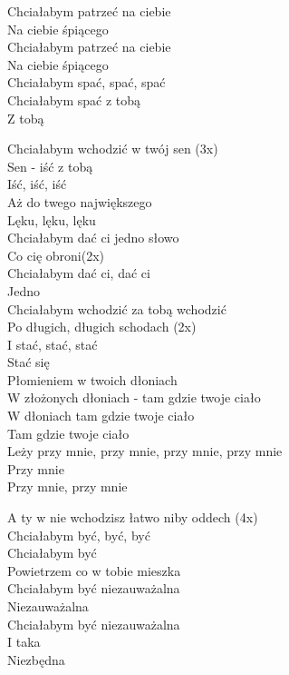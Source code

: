 \begin{text}
    Chciałabym patrzeć na ciebie\\
    Na ciebie śpiącego\\
    Chciałabym patrzeć na ciebie\\
    Na ciebie śpiącego\\
    Chciałabym spać, spać, spać\\
    Chciałabym spać z tobą\\
    Z tobą

    Chciałabym wchodzić w twój sen (3x)\\
    Sen - iść z tobą\\
    Iść, iść, iść\\
    Aż do twego największego\\
    Lęku, lęku, lęku\\
    Chciałabym dać ci jedno słowo\\
    Co cię obroni(2x)\\
    Chciałabym dać ci, dać ci\\
    Jedno\\
    Chciałabym wchodzić za tobą wchodzić\\
    Po długich, długich schodach (2x)\\
    I stać, stać, stać\\
    Stać się\\
    Płomieniem w twoich dłoniach\\
    W złożonych dłoniach - tam gdzie twoje ciało\\
    W dłoniach tam gdzie twoje ciało\\
    Tam gdzie twoje ciało\\
    Leży przy mnie, przy mnie, przy mnie, przy mnie\\
    Przy mnie\\
    Przy mnie, przy mnie

    A ty w nie wchodzisz łatwo niby oddech (4x)\\
    Chciałabym być, być, być\\
    Chciałabym być\\
    Powietrzem co w tobie mieszka\\
    Chciałabym być niezauważalna\\
    Niezauważalna\\
    Chciałabym być niezauważalna\\
    I taka\\
    Niezbędna
\end{text}
\begin{chord}

\end{chord}